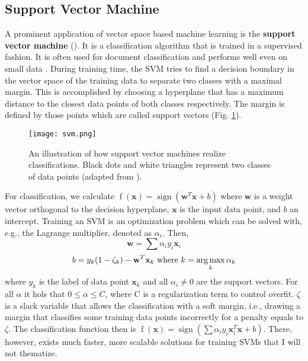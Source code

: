 \subsection{Support Vector Machine}
  A prominent application of vector space based machine learning is the \textbf{support vector machine} ().
  It is a classification algorithm that is trained in a supervised fashion. It is often used for document classification and performs well even on small data \citep{Manning2008}.
  During training time, the SVM tries to find a decision boundary in the vector space of the training data to separate two classes with a maximal margin.
  This is accomplished by choosing a hyperplane that has a maximum distance to the closest data points of both classes respectively. The margin is defined by those points which are called support vectors (Fig. \ref{fig:svm}).
  \begin{figure}[h]
      \centering
      \texttt{[image: svm.png]}
      \caption{An illustration of how support vector machines realize classifications. Black dots and white triangles represent two classes of data points (adapted from \cite{Manning2008}).}
      \label{fig:svm}
  \end{figure}
  For classification, we calculate $\operatorname{f}(\mathbf{x}) = \operatorname{sign}(\mathbf{w}^{T}\mathbf{x} + b)$ where $\mathbf{w}$ is a weight vector orthogonal to the decision hyperplane, $\mathbf{x}$ is the input data point, and $b$ an intercept.
  Training an SVM is an optimization problem which can be solved with, e.g., the Lagrange multiplier, denoted as $\alpha_i$.
  Then,
    \[\mathbf{w} = \sum \alpha_i y_i \mathbf{x}_i \]
    \[b = y_k (1-\zeta_k) - \mathbf{w}^T \mathbf{x}_k \text{ where }k = \operatorname*{arg\,max}_k \alpha_k \]
  where $y_k$ is the label of data point $\mathbf{x}_k$ and all $\alpha_i \neq 0$ are the support vectors. For all $\alpha$ it hols that $0 \leq \alpha \leq C$, where C is a regularization term to control overfit. $\zeta$ is a slack variable that allows the classification with a soft margin, i.e., drawing a margin that classifies some training data points incorrectly for a penalty equals to $\zeta$.
  The classification function then is $\operatorname{f}(\mathbf{x}) = \operatorname{sign}(\sum \alpha_i y_i \mathbf{x}^{T}_i\mathbf{x} + b)$.
  There, however, exists much faster, more scalable solutions for training SVMs that I will not thematize.


